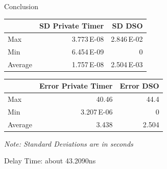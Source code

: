 \documentclass[pdf]{beamer}
\begin{document}
\begin{frame}{Conclusion}
  \begin{center}
    \begin{tabular}{lrr}
      & SD Private Timer & SD DSO\\
      \hline
      Max & 3.773\,E-08 & 2.846\,E-02\\
      Min & 6.454\,E-09 & 0\\
      Average & 1.757\,E-08 & 2.504\,E-03\\
      \hline
    \end{tabular}
  \end{center}

  \begin{center}
    \begin{tabular}{lrr}
      & Error Private Timer & Error DSO\\
      \hline
      Max & 40.46 & 44.4\\
      Min & 3.207\,E-06 & 0\\
      Average & 3.438 & 2.504\\
      \hline
    \end{tabular}
  \end{center}
  \center\small\emph{Note: Standard Deviations are in seconds}

  \hfill
  
  Delay Time: about 43.2090ns
\end{frame}
\end{document}
